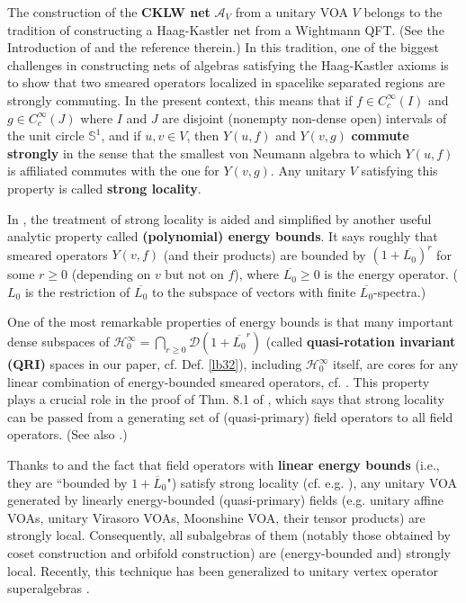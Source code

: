 \documentclass[11pt,b5paper,notitlepage]{article}
\theoremstyle{definition}
\theoremstyle{plain}
\newcommand{\mc}{\mathcal}
\newcommand{\ovl}{\overline}
\newcommand{\Dom}{\scr D}
\newcommand{\scr}{\mathscr}
\newcommand{\Sbb}{{\mathbb S}}
\numberwithin{equation}{section}
\begin{document}
The construction of the \textbf{CKLW net} $\mc A_V$ from a unitary VOA $V$ belongs to the tradition of constructing a Haag-Kastler net from a Wightmann QFT. (See the Introduction of \cite{CKLW18} and the reference therein.) In this tradition, one of the biggest challenges in constructing nets of algebras satisfying the Haag-Kastler axioms \cite{Haag96} is to show that two smeared operators localized in spacelike separated regions are strongly commuting. In the present context, this means that if $f\in C_c^\infty(I)$ and $g\in C_c^\infty(J)$ where $I$ and $J$ are disjoint (nonempty non-dense open) intervals of the unit circle $\Sbb^1$, and if $u,v\in V$, then $Y(u,f)$ and $Y(v,g)$ \textbf{commute strongly} in the sense that the smallest von Neumann algebra to which $Y(u,f)$ is affiliated commutes with the one for $Y(v,g)$. Any unitary $V$ satisfying this property is called \textbf{strong locality}.


In \cite{CKLW18}, the treatment of strong locality is aided and simplified by another useful analytic property called \textbf{(polynomial) energy bounds}. It says roughly that smeared operators $Y(v,f)$ (and their products) are bounded by $(1+\ovl{L_0})^r$ for some $r\geq0$ (depending on $v$ but not on $f$), where $\ovl{L_0}\geq0$ is the energy operator. ($L_0$ is the restriction of $\ovl{L_0}$ to the subspace of vectors with finite $\ovl{L_0}$-spectra.) 

One of the most remarkable properties of energy bounds is that many important dense subspaces of $\mc H_0^\infty=\bigcap_{r\geq0}\Dom(1+\ovl{L_0}^r)$ (called \textbf{quasi-rotation invariant (QRI)} spaces in our paper, cf. Def. \ref{lb32}), including $\mc H_0^\infty$ itself, are cores for any linear combination of energy-bounded smeared operators, cf. \cite[Lem. 7.2]{CKLW18}. This property plays a crucial role in the proof of Thm. 8.1 of \cite{CKLW18}, which says that strong locality can be passed from a generating set of (quasi-primary) field operators to all field operators. (See also \cite{DSW86}.) 



Thanks to \cite[Thm. 8.1]{CKLW18} and the fact that field operators with \textbf{linear energy bounds} (i.e., they are ``bounded by $1+\ovl L_0$") satisfy strong locality (cf. e.g. \cite{GJ87,DF77,BS90}), any unitary VOA generated by linearly energy-bounded (quasi-primary) fields (e.g. unitary affine VOAs, unitary Virasoro VOAs, Moonshine VOA, their tensor products) are strongly local. Consequently, all subalgebras of them (notably those obtained by coset construction and orbifold construction) are (energy-bounded and) strongly local. Recently, this technique has been generalized to unitary vertex operator superalgebras \cite{CGH23}.
\end{document}
